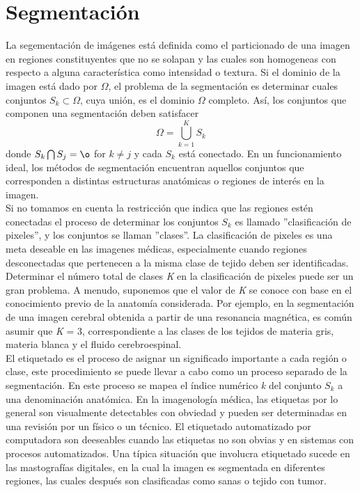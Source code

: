 \documentclass[12pt]{report}
\begin{document}
\section{Segmentación}
La segementación de imágenes está definida como el particionado de una imagen en regiones constituyentes que no se solapan y las cuales son homogeneas con respecto a alguna característica como intensidad o textura. Si el dominio de la imagen está dado por $\Omega$, el problema de la segmentación es determinar cuales conjuntos $S_{k} \subset \Omega$, cuya unión, es el dominio $\Omega$ completo. Así, los conjuntos que componen una segmentación deben satisfacer \begin{equation} \Omega = \bigcup_{k = 1}^{K} S_{k} \end{equation}
donde $S_{k} \bigcap S_{j} = \o$ for $ k \neq j$ y cada $S_{k}$ está conectado. En un funcionamiento ideal, los métodos de segmentación encuentran aquellos conjuntos que corresponden a distintas estructuras anatómicas o regiones de interés en la imagen.\\
Si no tomamos en cuenta la restricción que indica que las regiones estén conectadas el proceso de determinar los conjuntos $S_{k}$ es llamado ''clasificación de pixeles'', y los conjuntos se llaman ''clases''. 
La clasificación de pixeles es una meta deseable en las imagenes médicas, especialmente cuando regiones desconectadas que pertenecen a la misma clase de tejido deben ser identificadas. Determinar el número total  de clases \textit{K} en la clasificación de pixeles puede ser un gran problema. 
A menudo, suponemos que el valor de \textit{K} se conoce con base en el conocimiento previo de la anatomía considerada. Por ejemplo, en la segmentación de una imagen cerebral obtenida a partir de una resonancia magnética, es común asumir que \textit{K} = 3, correspondiente a las clases de los tejidos de materia gris, materia blanca y el fluido cerebroespinal.\\
El etiquetado es el proceso de asignar un significado importante a cada región o clase, este procedimiento se puede llevar a cabo como un proceso separado de la segmentación. En este proceso se mapea el índice numérico \textit{k} del conjunto $S_{k}$ a una denominación anatómica. En la imagenología médica, las etiquetas por lo general son visualmente detectables con obviedad y pueden ser determinadas en una revisión por un físico o un técnico. El etiquetado automatizado por computadora son deeseables cuando las etiquetas no son obvias y en sistemas con procesos automatizados. Una típica situación que involucra etiquetado sucede en las mastografías digitales, en la cual la imagen es segmentada en diferentes regiones, las cuales después son clasificadas como sanas o tejido con tumor.
\end{document}
